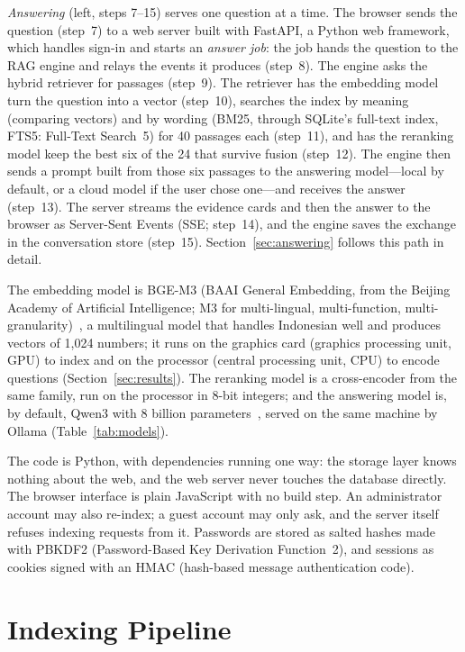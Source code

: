 \documentclass[conference]{IEEEtran}
\begin{document}
\emph{Answering} (left, steps 7--15) serves one question at a time. The browser
sends the question (step~7) to a web server built with FastAPI, a Python web
framework, which handles
sign-in and starts an \emph{answer job}: the job hands the question to the RAG
engine and relays the events it produces (step~8). The engine asks the hybrid
retriever for passages (step~9). The retriever has the embedding model turn the
question into a vector (step~10), searches the index by meaning (comparing
vectors) and by wording (BM25, through SQLite's full-text index, FTS5:
Full-Text Search~5) for 40
passages each (step~11), and has the reranking model keep the best six
of the 24 that survive fusion (step~12). The engine then sends a prompt built
from those six passages to the answering model---local by default, or a cloud
model if the user chose one---and receives the answer (step~13). The server
streams the evidence cards and then the answer to the browser as Server-Sent
Events (SSE; step~14), and
the engine saves the exchange in the conversation store (step~15).
Section~\ref{sec:answering} follows this path in detail.

The embedding model is BGE-M3 (BAAI General Embedding, from the Beijing
Academy of Artificial Intelligence; M3 for multi-lingual, multi-function,
multi-granularity)~\cite{bge}, a multilingual model that
handles Indonesian well and produces vectors of 1{,}024 numbers; it runs on the
graphics card (graphics processing unit, GPU) to index and on the processor
(central processing unit, CPU) to encode questions
(Section~\ref{sec:results}). The reranking model is a cross-encoder from the
same family, run on the processor in 8-bit integers; and the answering model
is, by default, Qwen3 with 8 billion parameters~\cite{qwen}, served on the same
machine by Ollama (Table~\ref{tab:models}).

The code is Python, with dependencies running one way: the storage layer knows
nothing about the web, and the web server never touches the database directly.
The browser interface is plain JavaScript with no build step. An administrator
account may also re-index; a guest account may only ask, and the server itself
refuses indexing requests from it. Passwords are stored as salted hashes made
with PBKDF2 (Password-Based Key Derivation Function~2), and sessions as cookies
signed with an HMAC (hash-based message authentication code).

\section{Indexing Pipeline}
\label{sec:indexing}
\end{document}
